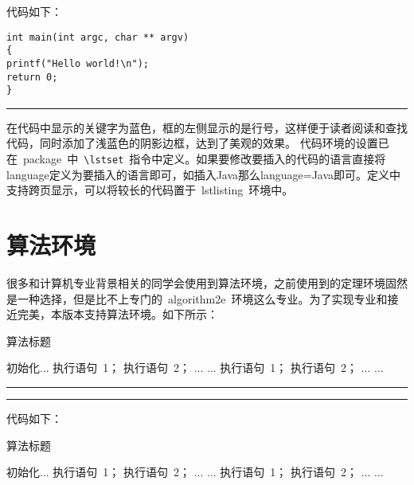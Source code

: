 \noindent 代码如下：
\begin{VerbWithBreak}
\begin{lstlisting}
int main(int argc, char ** argv)
{
printf("Hello world!\n");
return 0;
}
\end{lstlisting}
\end{VerbWithBreak}
\noindent\hrule\vspace{1em}

在代码中显示的关键字为蓝色，框的左侧显示的是行号，这样便于读者阅读和查找代码，同时添加了浅蓝色的阴影边框，达到了美观的效果。
代码环境的设置已在~package~中~\verb|\lstset|~指令中定义。如果要修改要插入的代码的语言直接将language定义为要插入的语言即可，如插入Java那么language=Java即可。定义中支持跨页显示，可以将较长的代码置于~lstlisting~环境中。
\section{算法环境}
很多和计算机专业背景相关的同学会使用到算法环境，之前使用到的定理环境固然是一种选择，但是比不上专门的~algorithm2e~环境这么专业。为了实现专业和接近完美，本版本支持算法环境。如下所示：
\begin{algorithm}[H]
    \caption{算法标题}
    \label{alg:demoAlgo} %
    \begin{algorithmic}[1]  %
    \STATE 初始化...
        \STATE 执行语句~1；
        \STATE 执行语句~2；
        \STATE ...
    \ENDFOR
    \STATE ...
        \STATE 执行语句~1；
        \STATE 执行语句~2；
        \STATE ...
    \ENDWHILE
    \STATE ...
    \end{algorithmic}
\end{algorithm}
\noindent\hrule
\vspace{0.1em}\noindent\hrule

\vspace{1em}

\noindent 代码如下：
\begin{VerbWithBreak}
  \begin{algorithm}[H]
    \caption{算法标题}
    \label{alg:demoAlgo} %
    \begin{algorithmic}[1]  %
    \STATE 初始化...
        \STATE 执行语句~1；
        \STATE 执行语句~2；
        \STATE ...
    \ENDFOR
    \STATE ...
        \STATE 执行语句~1；
        \STATE 执行语句~2；
        \STATE ...
    \ENDWHILE
    \STATE ...
    \end{algorithmic}
\end{algorithm}
\end{VerbWithBreak}

